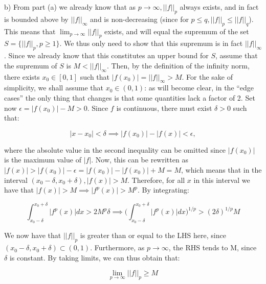 \begin{solution}
    b) From part (a) we already know that as $p \rightarrow \infty, \lvert \lvert f \rvert \rvert _p$ always exists, and in fact is bounded above by $\lvert \lvert f \rvert \rvert _{\infty}$ and is non-decreasing (since for $p \leq q, \lvert \lvert f \rvert \rvert _p \leq \lvert \lvert f \rvert \rvert _q$).
    This means that $\lim_{p \rightarrow \infty} \lvert \lvert f \rvert \rvert _p$ exists, and will equal the supremum of the set $S = \{ \lvert \lvert f \rvert \rvert _{p}, p \geq 1\}$.
    We thus only need to show that this supremum is in fact $\lvert \lvert f \rvert \rvert _{\infty}$.
    Since we already know that this constitutes an upper bound for $S$, assume that the supremum of $S$ is $M < \lvert \lvert f \rvert \rvert_{\infty}$.
    Then, by the definition of the infinity norm, there exists $x_0 \in [0, 1]$ such that $\lvert f(x_0) \rvert = \lvert \lvert f \rvert \rvert _{\infty} > M$.
    For the sake of simplicity, we shall assume that $x_0 \in (0, 1)$: as will become clear, in the ``edge cases'' the only thing that changes is that some quantities lack a factor of 2.
    Set now $\epsilon = \lvert f(x_0) \rvert - M > 0$.
    Since $f$ is continuous, there must exist $\delta > 0$ such that:
    
    $$\lvert x - x_0 \rvert < \delta \implies \lvert f(x_0) \rvert - \lvert f(x) \rvert < \epsilon,$$

    where the absolute value in the second inequality can be omitted since $\lvert f(x_0) \rvert$ is the maximum value of $\lvert f \rvert$.
    Now, this can be rewritten as $\lvert f(x) \rvert > \lvert f(x_0) \rvert - \epsilon = \lvert f(x_0) \rvert - \lvert f(x_0) \rvert + M = M$, which means that in the interval $(x_0 - \delta, x_0 + \delta), \lvert f(x) \rvert > M$.
    Therefore, for all $x$ in this interval we have that $\lvert f(x) \rvert > M \implies \lvert f^p(x) \rvert > M^p$. 
    By integrating:

    $$\int_{x_0 - \delta}^{x_0 + \delta} \lvert f^p(x) \rvert dx > 2M^p \delta \implies \Biggl(\int_{x_0 - \delta}^{x_0 + \delta} \lvert f^p(x) \rvert dx\Biggr)^{1/p} > (2\delta)^{1/p}M$$

    We now have that $\lvert \lvert f \rvert \rvert _p$ is greater than or equal to the LHS here, since $(x_0 - \delta, x_0 + \delta) \subset (0, 1)$.
    Furthermore, as $p \rightarrow \infty$, the RHS tends to M, since $\delta$ is constant.
    By taking limits, we can thus obtain that:

    $$\lim_{p \rightarrow \infty} \lvert \lvert f \rvert \rvert _p \geq M$$


\end{solution}
